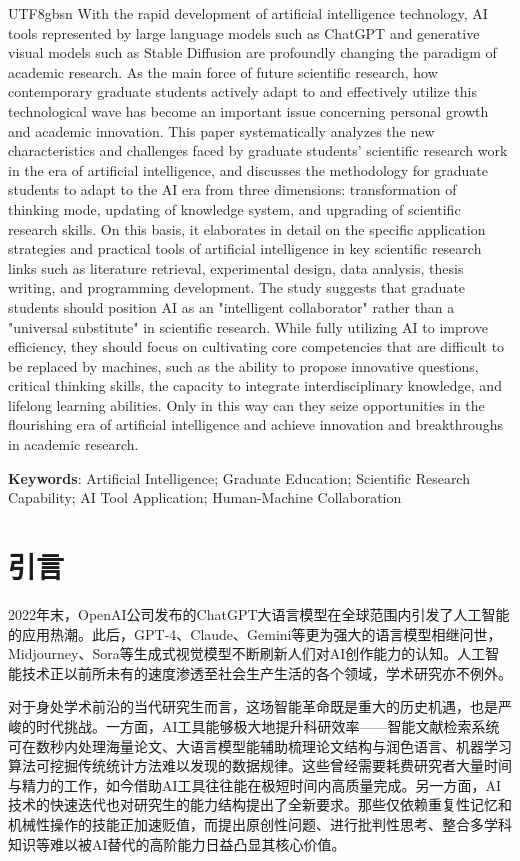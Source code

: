 \documentclass[12pt,a4paper]{article}
\begin{document}
\begin{CJK}{UTF8}{gbsn}
With the rapid development of artificial intelligence technology, AI tools represented by large language models such as ChatGPT and generative visual models such as Stable Diffusion are profoundly changing the paradigm of academic research. As the main force of future scientific research, how contemporary graduate students actively adapt to and effectively utilize this technological wave has become an important issue concerning personal growth and academic innovation. This paper systematically analyzes the new characteristics and challenges faced by graduate students' scientific research work in the era of artificial intelligence, and discusses the methodology for graduate students to adapt to the AI era from three dimensions: transformation of thinking mode, updating of knowledge system, and upgrading of scientific research skills. On this basis, it elaborates in detail on the specific application strategies and practical tools of artificial intelligence in key scientific research links such as literature retrieval, experimental design, data analysis, thesis writing, and programming development. The study suggests that graduate students should position AI as an "intelligent collaborator" rather than a "universal substitute" in scientific research. While fully utilizing AI to improve efficiency, they should focus on cultivating core competencies that are difficult to be replaced by machines, such as the ability to propose innovative questions, critical thinking skills, the capacity to integrate interdisciplinary knowledge, and lifelong learning abilities. Only in this way can they seize opportunities in the flourishing era of artificial intelligence and achieve innovation and breakthroughs in academic research.

\noindent\textbf{Keywords}: Artificial Intelligence; Graduate Education; Scientific Research Capability; AI Tool Application; Human-Machine Collaboration

\newpage
\tableofcontents
\newpage

\section{引言}

2022年末，OpenAI公司发布的ChatGPT大语言模型在全球范围内引发了人工智能的应用热潮。此后，GPT-4、Claude、Gemini等更为强大的语言模型相继问世，Midjourney、Sora等生成式视觉模型不断刷新人们对AI创作能力的认知。人工智能技术正以前所未有的速度渗透至社会生产生活的各个领域，学术研究亦不例外。

对于身处学术前沿的当代研究生而言，这场智能革命既是重大的历史机遇，也是严峻的时代挑战。一方面，AI工具能够极大地提升科研效率——智能文献检索系统可在数秒内处理海量论文、大语言模型能辅助梳理论文结构与润色语言、机器学习算法可挖掘传统统计方法难以发现的数据规律。这些曾经需要耗费研究者大量时间与精力的工作，如今借助AI工具往往能在极短时间内高质量完成。另一方面，AI技术的快速迭代也对研究生的能力结构提出了全新要求。那些仅依赖重复性记忆和机械性操作的技能正加速贬值，而提出原创性问题、进行批判性思考、整合多学科知识等难以被AI替代的高阶能力日益凸显其核心价值。


\end{CJK}
\end{document}
